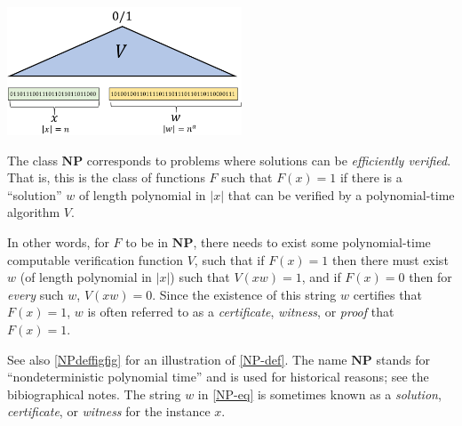 \begin{marginfigure}
\centering
\includegraphics[width=\linewidth, height=1.5in, keepaspectratio]{../figure/NPdefinitionfig.png}
\caption{The class \(\mathbf{NP}\) corresponds to problems where
solutions can be \emph{efficiently verified}. That is, this is the class
of functions \(F\) such that \(F(x)=1\) if there is a ``solution'' \(w\)
of length polynomial in \(|x|\) that can be verified by a
polynomial-time algorithm \(V\).}
\label{NPdeffigfig}
\end{marginfigure}

\hypertarget{NP-def}{}

In other words, for \(F\) to be in \(\mathbf{NP}\), there needs to exist
some polynomial-time computable verification function \(V\), such that
if \(F(x)=1\) then there must exist \(w\) (of length polynomial in
\(|x|\)) such that \(V(xw)=1\), and if \(F(x)=0\) then for \emph{every}
such \(w\), \(V(xw)=0\). Since the existence of this string \(w\)
certifies that \(F(x)=1\), \(w\) is often referred to as a
\emph{certificate}, \emph{witness}, or \emph{proof} that \(F(x)=1\).

See also \cref{NPdeffigfig} for an illustration of \cref{NP-def}. The
name \(\mathbf{NP}\) stands for ``nondeterministic polynomial time'' and
is used for historical reasons; see the bibiographical notes. The string
\(w\) in \eqref{NP-eq} is sometimes known as a \emph{solution},
\emph{certificate}, or \emph{witness} for the instance \(x\).

\hypertarget{NPalternativeex}{}

